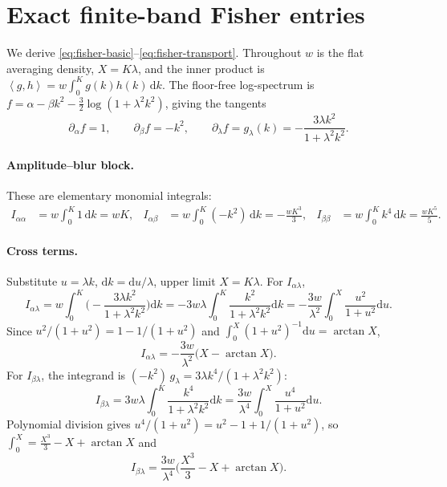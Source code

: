 \documentclass[11pt]{article}
\newcommand{\dd}{\mathrm{d}}
\newcommand{\inner}[2]{\left\langle #1,#2\right\rangle}
\begin{document}
\section{Exact finite-band Fisher entries}
\label{app:fisher}

We derive \eqref{eq:fisher-basic}--\eqref{eq:fisher-transport}. Throughout \(w\) is the flat averaging density, \(X=K\lambda\), and the inner product is \(\inner{g}{h}=w\int_0^K g(k)h(k)\,\dd k\). The floor-free log-spectrum is \(f=\alpha-\beta k^2-\tfrac32\log(1+\lambda^2k^2)\), giving the tangents
\begin{equation}
\partial_\alpha f=1,\qquad \partial_\beta f=-k^2,\qquad
\partial_\lambda f=g_\lambda(k)=-\frac{3\lambda k^2}{1+\lambda^2k^2}.
\label{eq:appB-tangents}
\end{equation}

\paragraph{Amplitude--blur block.} These are elementary monomial integrals:
\begin{align}
I_{\alpha\alpha}&=w\!\int_0^K 1\,\dd k=wK, &
I_{\alpha\beta}&=w\!\int_0^K(-k^2)\,\dd k=-\tfrac{wK^3}{3}, &
I_{\beta\beta}&=w\!\int_0^K k^4\,\dd k=\tfrac{wK^5}{5}.
\label{eq:appB-block}
\end{align}

\paragraph{Cross terms.} Substitute \(u=\lambda k\), \(\dd k=\dd u/\lambda\), upper limit \(X=K\lambda\). For \(I_{\alpha\lambda}\),
\begin{equation}
I_{\alpha\lambda}=w\!\int_0^K\!\!\Big(\!-\frac{3\lambda k^2}{1+\lambda^2k^2}\Big)\dd k
=-3w\lambda\!\int_0^K\!\frac{k^2}{1+\lambda^2k^2}\dd k
=-\frac{3w}{\lambda^2}\!\int_0^X\!\frac{u^2}{1+u^2}\dd u.
\label{eq:appB-al1}
\end{equation}
Since \(u^2/(1+u^2)=1-1/(1+u^2)\) and \(\int_0^X(1+u^2)^{-1}\dd u=\arctan X\),
\begin{equation}
I_{\alpha\lambda}=-\frac{3w}{\lambda^2}\big(X-\arctan X\big).
\label{eq:appB-al2}
\end{equation}
For \(I_{\beta\lambda}\), the integrand is \((-k^2)\,g_\lambda=3\lambda k^4/(1+\lambda^2k^2)\):
\begin{equation}
I_{\beta\lambda}=3w\lambda\!\int_0^K\!\frac{k^4}{1+\lambda^2k^2}\dd k
=\frac{3w}{\lambda^4}\!\int_0^X\!\frac{u^4}{1+u^2}\dd u.
\label{eq:appB-bl1}
\end{equation}
Polynomial division gives \(u^4/(1+u^2)=u^2-1+1/(1+u^2)\), so \(\int_0^X=\tfrac{X^3}{3}-X+\arctan X\) and
\begin{equation}
I_{\beta\lambda}=\frac{3w}{\lambda^4}\Big(\frac{X^3}{3}-X+\arctan X\Big).
\label{eq:appB-bl2}
\end{equation}
\end{document}
